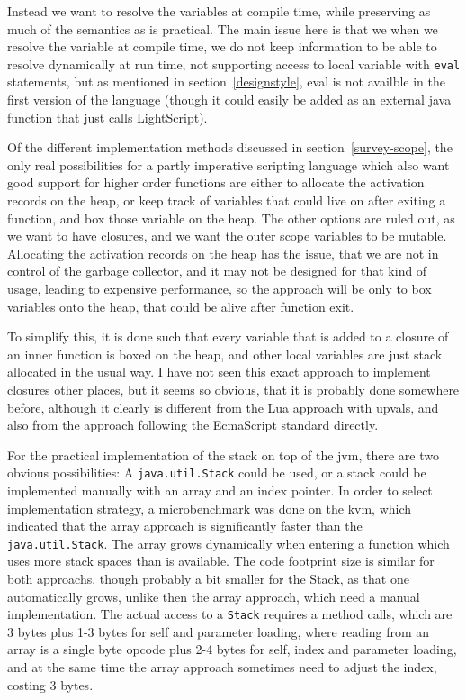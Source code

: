 \documentclass[11pt]{report}
\begin{document}
Instead we want to resolve the variables at compile time, while preserving as much of the semantics as is practical. The main issue here is that we when we resolve the variable at compile time, we do not keep information to be able to resolve dynamically at run time, not supporting access to local variable with \verb|eval| statements, but as mentioned in section~\ref{designstyle}, eval is not availble in the first version of the language (though it could easily be added as an external java function that just calls LightScript).

Of the different implementation methods discussed in section~\ref{survey-scope}, the only real possibilities for a partly imperative scripting language which also want good support for higher order functions are either to allocate the activation records on the heap, or keep track of variables that could live on after exiting a function, and box those variable on the heap.
The other options are ruled out, as we want to have closures, and we want the outer scope variables to be mutable.
Allocating the activation records on the heap has the issue, that we are not in control of the garbage collector, and it may not be designed for that kind of usage, leading to expensive performance, so the approach will be only to box variables onto the heap, that could be alive after function exit.

To simplify this, it is done such that every variable that is added to a closure of an inner function is boxed on the heap, and other local variables are just stack allocated in the usual way. 
I have not seen this exact approach to implement closures other places, but it seems so obvious, that it is probably done somewhere before, although it clearly is different from the Lua approach with upvals\cite{luasrc}, and also from the approach following the EcmaScript standard\cite{ecmascript} directly.

For the practical implementation of the stack on top of the jvm, there are two obvious possibilities: A \verb|java.util.Stack| could be used, or a stack could be implemented manually with an array and an index pointer. 
In order to select implementation strategy, a microbenchmark was done on the kvm, which indicated that the array approach is significantly faster than the \verb|java.util.Stack|. The array grows dynamically when entering a function which uses more stack spaces than is available. 
The code footprint size is similar for both approachs, though probably a bit smaller for the Stack, as that one automatically grows, unlike then the array approach, which need a manual implementation.
The actual access to a \verb|Stack| requires a method calls, which are 3 bytes plus 1-3 bytes for self and parameter loading, where reading from an array is a single byte opcode plus 2-4 bytes for self, index and parameter loading, and at the same time the array approach sometimes need to adjust the index, costing 3 bytes.
\end{document}
